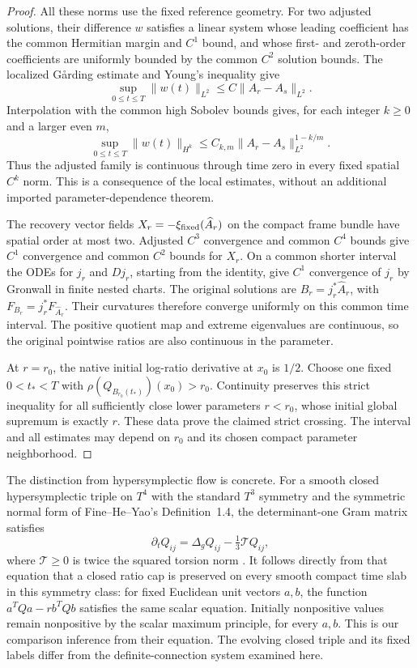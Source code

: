 \documentclass[11pt]{article}
\numberwithin{equation}{section}
\theoremstyle{definition}
\theoremstyle{remark}
\begin{document}
\begin{proof}
All these norms use the fixed reference geometry. For two
adjusted solutions, their difference $w$ satisfies a linear
system whose leading coefficient has the common Hermitian
margin and $C^1$ bound, and whose first- and zeroth-order
coefficients are uniformly bounded by the common $C^2$
solution bounds. The localized G{\aa}rding estimate and
Young's inequality give
\[
 \sup_{0\le t\le T}\|w(t)\|_{L^2}
       \le C\|A_r-A_s\|_{L^2}.
\]
Interpolation with the common high Sobolev bounds gives,
for each integer $k\ge0$ and a larger even $m$,
\[
 \sup_{0\le t\le T}\|w(t)\|_{H^k}
       \le C_{k,m}\|A_r-A_s\|_{L^2}^{1-k/m}.
\]
Thus the adjusted family is continuous through time zero
in every fixed spatial $C^k$ norm. This is a consequence
of the local estimates, without an additional imported
parameter-dependence theorem.

The recovery vector fields
$X_r=-\xi_{\rm fixed}(\widehat A_r)$ on the compact frame
bundle have spatial order at most two. Adjusted $C^3$
convergence and common $C^4$ bounds give $C^1$ convergence
and common $C^2$ bounds for $X_r$. On a common shorter
interval the ODEs for $j_r$ and $Dj_r$, starting from the
identity, give $C^1$ convergence of $j_r$ by Gronwall in
finite nested charts. The original solutions are
$B_r=j_r^*\widehat A_r$, with
$F_{B_r}=j_r^*F_{\widehat A_r}$. Their curvatures therefore
converge uniformly on this common time interval. The
positive quotient map and extreme eigenvalues are
continuous, so the original pointwise ratios are also
continuous in the parameter.

At $r=r_0$, the native initial log-ratio derivative at
$x_0$ is $1/2$. Choose one fixed $0<t_*<T$ with
$\rho(Q_{B_{r_0}(t_*)})(x_0)>r_0$. Continuity preserves
this strict inequality for all sufficiently close lower
parameters $r<r_0$, whose initial global supremum is
exactly $r$. These data prove the claimed strict crossing.
The interval and all estimates may depend on $r_0$ and
its chosen compact parameter neighborhood.
\end{proof}


The distinction from hypersymplectic flow is concrete. For a smooth closed
hypersymplectic triple on $T^4$ with the standard $T^3$ symmetry and the
symmetric normal form of Fine--He--Yao's Definition~1.4, the
determinant-one Gram matrix satisfies
\[
 \partial_tQ_{ij}=\Delta_gQ_{ij}-\tfrac13\mathcal T Q_{ij},
\]
where $\mathcal T\ge0$ is twice the squared torsion norm
\cite[Proposition 2.15, equation (2.6)]{FineHeYao2024SymmetricHypersymplecticFlow}.
It follows directly from that equation that a closed ratio cap is preserved
on every smooth compact time slab in this symmetry class: for fixed
Euclidean unit vectors $a,b$, the function
$a^TQa-rb^TQb$ satisfies the same scalar equation. Initially nonpositive
values remain nonpositive by the scalar maximum principle, for every
$a,b$. This is our comparison inference from their equation. The evolving
closed triple and its fixed labels differ from the definite-connection
system examined here.
\end{document}
